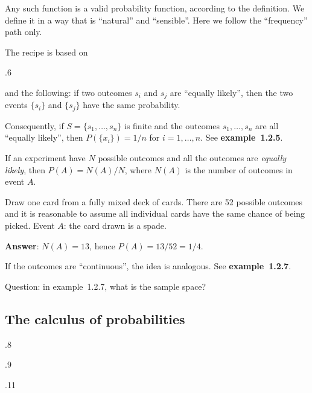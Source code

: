 \documentclass[12pt]{article}
\begin{document}
Any such function is a valid probability function, according to the
definition. We define it in a way that is ``natural'' and ``sensible''.
Here we follow the ``frequency'' path only.

The recipe is based on

.6

and the following:
if two outcomes $s_i$ and $s_j$ are ``equally likely'', then the two
events $\{s_i\}$ and $\{s_j\}$ have the same probability.

Consequently,
if $S = \{s_1,\dotsc,s_n\}$ is finite and the outcomes
$s_1,\dotsc,s_n$ are all ``equally likely'', then
$P(\{x_i\}) = 1/n$ for $i=1,\dotsc,n$.
See \textbf{example~1.2.5}.

If an experiment have $N$ possible outcomes and all the outcomes are
\emph{equally likely}, then $P(A) = N(A) / N$,
where $N(A)$ is the number of outcomes in event $A$.

\example
Draw one card from a fully mixed deck of cards.
There are 52 possible outcomes and
it is reasonable to assume all individual cards
have the same chance of being picked.
Event $A$: the card drawn is a spade.

\textbf{Answer}: $N(A) = 13$, hence $P(A) = 13/52 = 1/4$.


If the outcomes are ``continuous'', the idea is analogous.
See \textbf{example~1.2.7}.

Question: in example~1.2.7, what is the sample space?


\subsection{The calculus of probabilities}

.8

.9

.11

\end{document}
